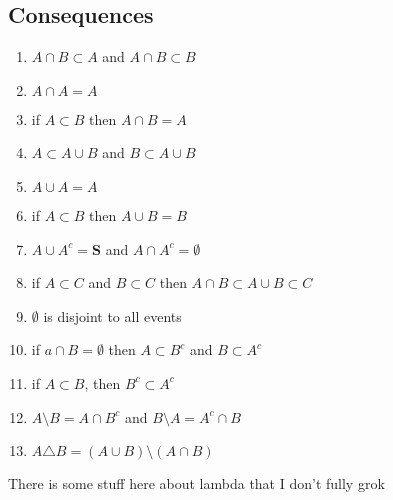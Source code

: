 \documentclass[12pt, oneside, letterpaper]{notes}
\begin{document}
\subsection*{Consequences}
\begin{enumerate}
	\item $A \cap B \subset A$ and $A \cap B \subset B$
	
	\item $A \cap A = A$

	\item if $A \subset B $ then $A \cap B = A $
	
	\item $A \subset A \cup B$ and $B \subset A \cup B$

	\item $A \cup A = A$

	\item if $ A \subset B$ then $A \cup B = B$

	\item $A \cup A^c = \textbf{S}$ and $A \cap A^c = \emptyset$

	\item if $A \subset C$ and $B \subset C$ 
	then $A \cap B \subset A \cup B \subset C$

	\item $\emptyset$ is disjoint to all events

	\item if $a \cap B = \emptyset$ then $A \subset B^c$
	and $B \subset A^c$

	\item if $A \subset B$, then $B^c \subset A^c$
	
	\item $A \setminus B = A \cap B^c$ and $B \setminus A = A^c \cap B$
	
	\item $A \triangle B = (A \cup B) \setminus (A \cap B) $
\end{enumerate}

\begin{remark}
	There is some stuff here about lambda that I don't fully grok
	
\end{remark}
\end{document}
